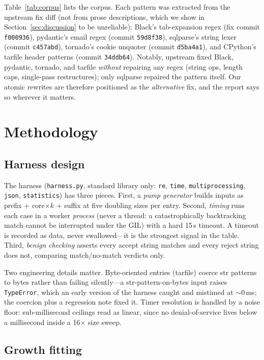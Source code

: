 \documentclass[11pt,a4paper]{article}
\begin{document}
Table~\ref{tab:corpus} lists the corpus. Each pattern was extracted from the upstream fix diff (not from prose descriptions, which we show in Section~\ref{sec:discussion} to be unreliable): Black's tab-expansion regex (fix commit \verb!f000936!), pydantic's email regex (commit \verb!59d8f38!), sqlparse's string lexer (commit \verb!c457abd!), tornado's cookie unquoter (commit \verb!d5ba4a1!), and CPython's tarfile header patterns (commit \verb!34ddb64!). Notably, upstream fixed Black, pydantic, tornado, and tarfile \textit{without} repairing any regex (string ops, length caps, single-pass restructures); only sqlparse repaired the pattern itself. Our atomic rewrites are therefore positioned as the \textit{alternative} fix, and the report says so wherever it matters.

\section{Methodology}

\subsection{Harness design}

The harness (\verb!harness.py!, standard library only: \verb!re!, \verb!time!, \verb!multiprocessing!, \verb!json!, \verb!statistics!) has three pieces. First, a \textit{pump generator} builds inputs as prefix + core$\times k$ + suffix at five doubling sizes per entry. Second, \textit{timing} runs each case in a worker \textit{process} (never a thread: a catastrophically backtracking match cannot be interrupted under the GIL) with a hard 15\,s timeout. A timeout is recorded as data, never swallowed---it is the strongest signal in the table. Third, \textit{benign checking} asserts every accept string matches and every reject string does not, comparing match/no-match verdicts only.

Two engineering details matter. Byte-oriented entries (tarfile) coerce str patterns to bytes rather than failing silently---a str-pattern-on-bytes input raises \verb!TypeError!, which an early version of the harness caught and mistimed at $\sim$0\,ms; the coercion plus a regression note fixed it. Timer resolution is handled by a noise floor: sub-millisecond ceilings read as linear, since no denial-of-service lives below a millisecond inside a 16$\times$ size sweep.

\subsection{Growth fitting}
\end{document}
